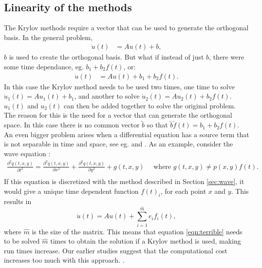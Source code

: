 \subsection{Linearity of the methods} \label{sec:linear} %
The Krylov methods require a vector that can be used to generate the orthogonal basis. In the general problem,
\begin{equation*}
\begin{aligned}
\dot{u}(t) &= Au(t) + b,
\end{aligned}
\end{equation*} 
$b$ is used to create the orthogonal basis. But what if instead of just $b$, there were some time dependance, eg. $b_1 + b_2f(t)$, or:
\begin{equation*}
\begin{aligned}
\dot{u}(t) &= Au(t) + b_1 + b_2 f(t).
\end{aligned}
\end{equation*} 
In this case the Krylov method needs to be used two times, one time to solve $ \dot{u}_1(t) = Au_1(t) + b_1 $, and another to solve $ \dot{u}_2(t) = Au_2(t) + b_2f(t) $. $u_1(t)$ and $u_2(t)$ can then be added together to solve the original problem.
The reason for this is the need for a vector that can generate the orthogonal space. In this case there is no common vector $\tilde{b}$ so that $\tilde{b} \tilde{f}(t) = b_1 +b_2 f(t)$. \\

\noindent An even bigger problem arises when a differential equation has a source term that is not separable in time and space, see eg. \cite{elena} and \cite{min}. %
As an example, consider the wave equation \cite{waveequ}:
\begin{equation*}
\begin{aligned}
\frac{\partial^2 q(t,x,y)}{\partial t^2} = \frac{\partial^2 q(t,x,y)}{\partial x^2 } +  \frac{\partial^2 q(t,x,y)}{\partial y^2 } + g(t,x,y) \quad \text{ where } g(t,x,y) \neq p(x,y) f(t). \\
\end{aligned}
\end{equation*}
If this equation is discretized with the method described in Section \ref{sec:wave}, it would give a unique time dependent function $f(t)_i$, for each point $x$ and $y$. This results in
\begin{equation} \label{eqn:terrible}
\dot{u}(t) = A u(t) + \sum \limits_{i = 1}^{\hat{m}} e_i f_i(t),
\end{equation}
where $\hat{m}$ is the size of the matrix. 
This means that equation \eqref{eqn:terrible} needs to be solved $\hat{m}$ times to obtain the solution if a Krylov method is used, making run times increase. Our earlier studies suggest that the computational cost increases too much with this approach. \cite{min}.

